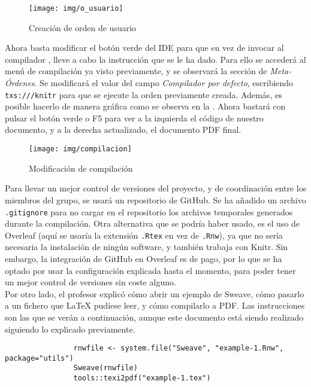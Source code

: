 \documentclass[12pt]{report}\usepackage[]{graphicx}\usepackage[dvipsnames]{xcolor}
\begin{document}
			\begin{figure}[H]
				\centering
				\texttt{[image: img/o\_usuario]}
				\caption{Creación de orden de usuario}
				\label{fig:orden}
			\end{figure}
			
			Ahora basta modificar el botón verde del IDE para que en vez de invocar al compilador , lleve a cabo la instrucción que se le ha dado. Para ello se accederá al menú de compilación ya visto previamente, y se observará la sección de \textit{Meta-Órdenes}. Se modificará el valor del campo \textit{Compilador por defecto}, escribiendo \texttt{txs:///knitr} para que se ejecute la orden previamente creada. Además, es posible hacerlo de manera gráfica como se observa en la . Ahora bastará con pulsar el botón verde o F5 para ver a la izquierda el código de nuestro documento, y a la derecha actualizado, el documento PDF final.
			
			\begin{figure}[H]
				\centering
				\texttt{[image: img/compilacion]}
				\caption{Modificación de compilación}
				\label{fig:comp}
			\end{figure}
			
			Para llevar un mejor control de versiones del proyecto, y de coordinación entre los miembros del grupo, se usará un repositorio de GitHub. Se ha añadido un archivo \texttt{.gitignore} para no cargar en el repositorio los archivos temporales generados durante la compilación. Otra alternativa que se podría haber usado, es el uso de Overleaf (aquí se usaría la extensión \texttt{.Rtex} en vez de \texttt{.Rnw}), ya que no sería necesaria la instalación de ningún software, y también trabaja con Knitr. Sin embargo, la integración de GitHub en Overleaf es de pago, por lo que se ha optado por usar la configuración explicada hasta el momento, para poder tener un mejor control de versiones sin coste alguno. \\
			
			Por otro lado, el profesor explicó cómo abrir un ejemplo de Sweave, cómo pasarlo a un fichero que \LaTeX{} pudiese leer, y cómo compilarlo a PDF. Las instrucciones son las que se verán a continuación, aunque este documento está siendo realizado siguiendo lo explicado previamente. 
			
			\begin{verbatim}
				rnwfile <- system.file("Sweave", "example-1.Rnw", package="utils")
				Sweave(rnwfile)
				tools::texi2pdf("example-1.tex")
			\end{verbatim}
			
\end{document}
